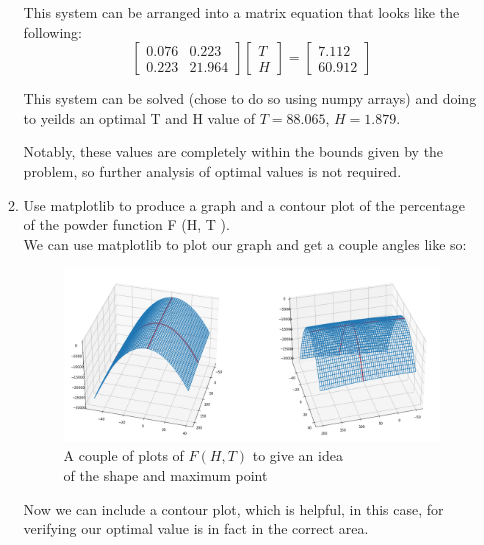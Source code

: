 \documentclass[11pt]{article}
\begin{document}
\begin{enumerate}
\begin{enumerate}
    This system can be arranged into a matrix equation that looks like the
    following:
    \[
    \begin{bmatrix}
        0.076 & 0.223\\
        0.223 & 21.964
    \end{bmatrix}
    \begin{bmatrix}
        T \\
        H
    \end{bmatrix}
    =
    \begin{bmatrix}
        7.112 \\
        60.912
    \end{bmatrix}
    \]

    This system can be solved (chose to do so using numpy arrays) and doing to
    yeilds an optimal T and H value of $T = 88.065$, $H = 1.879$.

    Notably, these values are completely within the bounds given by the
    problem, so further analysis of optimal values is not required.

    \item Use matplotlib to produce a graph and a contour plot of the percentage of the powder
    function F (H, T ).\\

    We can use matplotlib to plot our graph and get a couple angles like
    so:

    \begin{figure}[h]
        \centering
        \includegraphics[scale=.34]{output1.png}
        \caption{A couple of plots of $F(H,T)$ to give an idea\\ of the shape and
                 maximum point}
    \end{figure}


    Now we can include a contour plot, which is helpful, in this case, for
    verifying our optimal value is in fact in the correct area.


\end{enumerate}
\end{enumerate}
\end{document}
